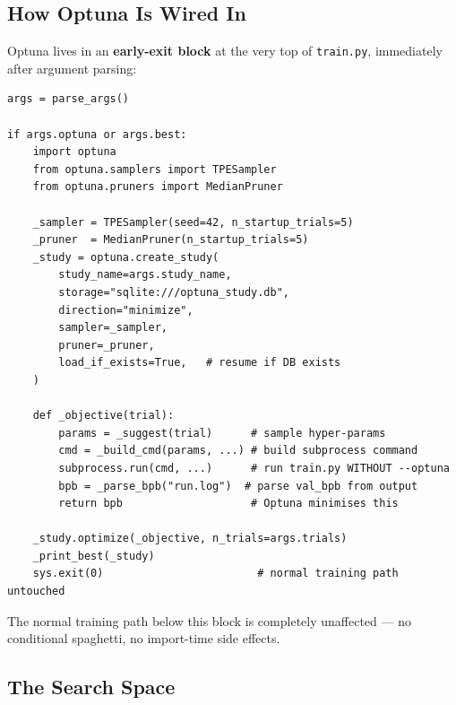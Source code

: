 \documentclass[12pt, a4paper]{article}
\newcommand{\trainpy}{\texttt{train.py}}
\begin{document}
\subsection{How Optuna Is Wired In}

Optuna lives in an \textbf{early-exit block} at the very top of \trainpy{}, immediately
after argument parsing:

\begin{tcolorbox}[codebox, title=train.py — Optuna early-exit (simplified)]
\begin{lstlisting}[style=pythonstyle]
args = parse_args()

if args.optuna or args.best:
    import optuna
    from optuna.samplers import TPESampler
    from optuna.pruners import MedianPruner

    _sampler = TPESampler(seed=42, n_startup_trials=5)
    _pruner  = MedianPruner(n_startup_trials=5)
    _study = optuna.create_study(
        study_name=args.study_name,
        storage="sqlite:///optuna_study.db",
        direction="minimize",
        sampler=_sampler,
        pruner=_pruner,
        load_if_exists=True,   # resume if DB exists
    )

    def _objective(trial):
        params = _suggest(trial)      # sample hyper-params
        cmd = _build_cmd(params, ...) # build subprocess command
        subprocess.run(cmd, ...)      # run train.py WITHOUT --optuna
        bpb = _parse_bpb("run.log")  # parse val_bpb from output
        return bpb                    # Optuna minimises this

    _study.optimize(_objective, n_trials=args.trials)
    _print_best(_study)
    sys.exit(0)                        # normal training path untouched
\end{lstlisting}
\end{tcolorbox}

The normal training path below this block is completely unaffected — no conditional spaghetti,
no import-time side effects.

\subsection{The Search Space}
\end{document}
